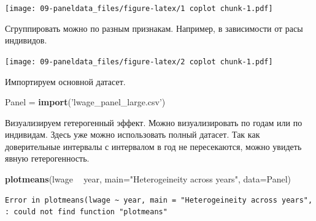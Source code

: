 \documentclass[]{book}
\newenvironment{Shaded}{\begin{snugshade}}{\end{snugshade}}
\newcommand{\ControlFlowTok}[1]{\textcolor[rgb]{0.13,0.29,0.53}{\textbf{#1}}}
\newcommand{\DataTypeTok}[1]{\textcolor[rgb]{0.13,0.29,0.53}{#1}}
\newcommand{\DecValTok}[1]{\textcolor[rgb]{0.00,0.00,0.81}{#1}}
\newcommand{\FloatTok}[1]{\textcolor[rgb]{0.00,0.00,0.81}{#1}}
\newcommand{\KeywordTok}[1]{\textcolor[rgb]{0.13,0.29,0.53}{\textbf{#1}}}
\newcommand{\NormalTok}[1]{#1}
\newcommand{\OperatorTok}[1]{\textcolor[rgb]{0.81,0.36,0.00}{\textbf{#1}}}
\newcommand{\StringTok}[1]{\textcolor[rgb]{0.31,0.60,0.02}{#1}}
\begin{document}
\texttt{[image: 09-paneldata\_files/figure-latex/1 coplot chunk-1.pdf]}

Сгруппировать можно по разным признакам. Например, в зависимости от расы индивидов.

\begin{Shaded}
\end{Shaded}

\texttt{[image: 09-paneldata\_files/figure-latex/2 coplot chunk-1.pdf]}

Импортируем основной датасет.

\begin{Shaded}
\begin{Highlighting}[]
\NormalTok{Panel =}\StringTok{ }\KeywordTok{import}\NormalTok{(}\StringTok{'lwage_panel_large.csv'}\NormalTok{)}
\end{Highlighting}
\end{Shaded}

Визуализируем гетерогенный эффект. Можно визуализировать по годам или по индивидам. Здесь уже можно использовать полный датасет. Так как доверительные интервалы с интервалом в год не пересекаются, можно увидеть явную гетерогенность.

\begin{Shaded}
\begin{Highlighting}[]
\KeywordTok{plotmeans}\NormalTok{(lwage }\OperatorTok{~}\StringTok{ }\NormalTok{year, }\DataTypeTok{main=}\StringTok{"Heterogeineity across years"}\NormalTok{, }\DataTypeTok{data=}\NormalTok{Panel)}
\end{Highlighting}
\end{Shaded}

\begin{verbatim}
Error in plotmeans(lwage ~ year, main = "Heterogeineity across years", : could not find function "plotmeans"
\end{verbatim}
\end{document}
